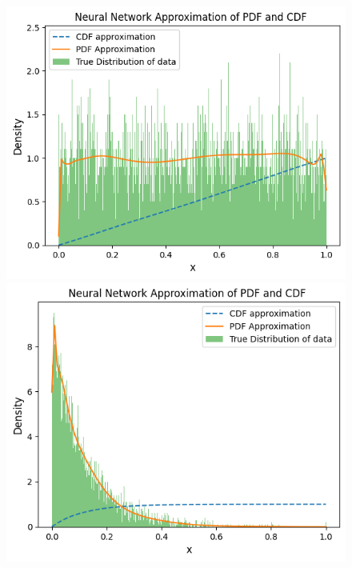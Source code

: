 \begin{figure}[h]
\vspace{1em}

\begin{minipage}{0.49\textwidth}
\centering
\includegraphics[width=\textwidth]{5ResultsDiscussion/pictures/MarginalTest/Uniform.png}
\end{minipage}
\hfill
\begin{minipage}{0.49\textwidth}
\centering
\includegraphics[width=\textwidth]{5ResultsDiscussion/pictures/MarginalTest/Exponential.png}
\end{minipage}


\end{figure}
